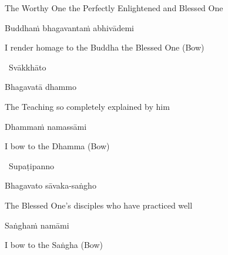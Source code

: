 \begin{english}
  The Worthy One the Perfectly Enlightened and Blessed One
\end{english}

Buddhaṁ bhagavantaṁ abhivādemi

\begin{english}
  I render homage to the Buddha the Blessed One \hfill{(Bow)}
\end{english}

\begin{leader}
  \anglebracketleft\ \hspace{-0.5mm}Svākkhāto \hspace{-0.5mm}\anglebracketright\
\end{leader}

\vspace{-0.5cm}

Bhagavatā dhammo

\begin{english}
  The Teaching so completely explained by him
\end{english}

Dhammaṁ namassāmi

\begin{english}
  I bow to the Dhamma \hfill{(Bow)}
\end{english}

\begin{leader}
  \anglebracketleft\ \hspace{-0.5mm}Supaṭipanno \hspace{-0.5mm}\anglebracketright\
\end{leader}

\vspace{-0.5cm}

Bhagavato sāvaka-saṅgho

\begin{english}
  The Blessed One's disciples who have practiced well
\end{english}

Saṅghaṁ namāmi

\begin{english}
  I bow to the Saṅgha \hfill{(Bow)}\\
\end{english}

\suttaRef{[Thai]}

\null
\vfill

